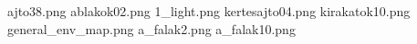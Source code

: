 ajto38.png
ablakok02.png
1_light.png
kertesajto04.png
kirakatok10.png
general_env_map.png
a_falak2.png
a_falak10.png
